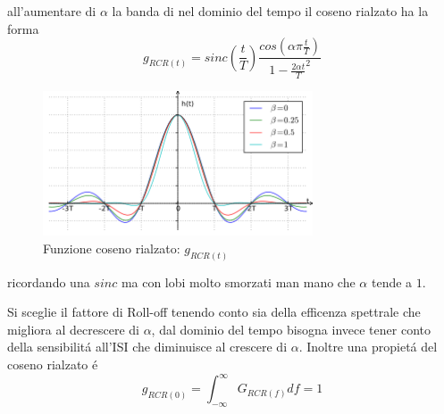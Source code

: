         all'aumentare di $\alpha$ la banda di nel dominio del tempo il coseno rialzato ha la forma
        \[
            g_{RCR(t)} = sinc(\frac{t}{T})\frac{cos(\alpha\pi\frac{t}{T})}{1-\frac{2\alpha t}{T}^2}  
        \]
        \begin{figure}[H]
            \centering
            \includegraphics[width = 8cm]{media/ht-Raised-cosine-impulse.png}
            \caption{Funzione coseno rialzato: $g_{RCR(t)}$}
        \end{figure}
        ricordando una $sinc$ ma con lobi molto smorzati man mano che $\alpha$ tende a $1$. 

        Si sceglie il fattore di Roll-off tenendo conto sia della efficenza spettrale che migliora al decrescere di $\alpha$,
        dal dominio del tempo bisogna invece tener conto della sensibilitá all'ISI che diminuisce al crescere di $\alpha$.
        Inoltre una propietá del coseno rialzato é \label{propieta coseno rialzato} 
        \[
            g_{RCR(0)} = \int_{-\infty}^{\infty}G_{RCR(f)}df = 1
        \]

